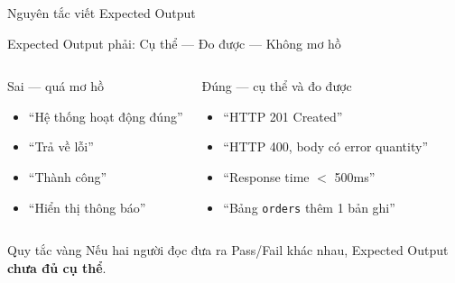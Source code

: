 \documentclass[aspectratio=169,12pt]{beamer}
\begin{document}
\begin{frame}[shrink=10]{Nguyên tắc viết Expected Output}
  \begin{block}{Expected Output phải: Cụ thể --- Đo được --- Không mơ hồ}
  \end{block}

  \vspace{0.4em}
  \begin{columns}
    \begin{alertblock}{Sai --- quá mơ hồ}
      \begin{itemize}
        \item ``Hệ thống hoạt động đúng''
        \item ``Trả về lỗi''
        \item ``Thành công''
        \item ``Hiển thị thông báo''
      \end{itemize}
    \end{alertblock}

    \begin{exampleblock}{Đúng --- cụ thể và đo được}
      \begin{itemize}
        \item ``HTTP 201 Created''
        \item ``HTTP 400, body có error quantity''
        \item ``Response time $<$ 500ms''
        \item ``Bảng \texttt{orders} thêm 1 bản ghi''
      \end{itemize}
    \end{exampleblock}
  \end{columns}

  \vspace{0.05em}
  \begin{alertblock}{Quy tắc vàng}
    \small Nếu hai người đọc đưa ra Pass/Fail khác nhau, Expected Output \textbf{chưa đủ cụ thể}.
  \end{alertblock}
\end{frame}
\end{document}
